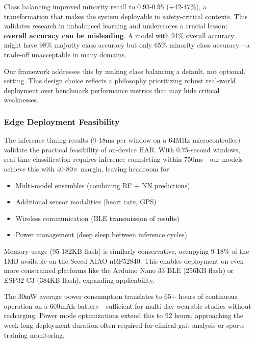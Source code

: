 Class balancing improved minority recall to 0.93-0.95 (+42-47\%), a transformation that makes the system deployable in safety-critical contexts. This validates research in imbalanced learning \cite{he2009learning, chawla2002smote} and underscores a crucial lesson: \textbf{overall accuracy can be misleading}. A model with 91\% overall accuracy might have 98\% majority class accuracy but only 65\% minority class accuracy—a trade-off unacceptable in many domains.

Our framework addresses this by making class balancing a default, not optional, setting. This design choice reflects a philosophy prioritizing robust real-world deployment over benchmark performance metrics that may hide critical weaknesses.

\subsubsection{Edge Deployment Feasibility}
The inference timing results (9-18ms per window on a 64MHz microcontroller) validate the practical feasibility of on-device HAR. With 0.75-second windows, real-time classification requires inference completing within 750ms—our models achieve this with 40-80× margin, leaving headroom for:
\begin{itemize}
    \item Multi-model ensembles (combining RF + NN predictions)
    \item Additional sensor modalities (heart rate, GPS)
    \item Wireless communication (BLE transmission of results)
    \item Power management (deep sleep between inference cycles)
\end{itemize}

Memory usage (95-182KB flash) is similarly conservative, occupying 9-18\% of the 1MB available on the Seeed XIAO nRF52840. This enables deployment on even more constrained platforms like the Arduino Nano 33 BLE (256KB flash) or ESP32-C3 (384KB flash), expanding applicability.

The 30mW average power consumption translates to 65+ hours of continuous operation on a 600mAh battery—sufficient for multi-day wearable studies without recharging. Power mode optimizations extend this to 92 hours, approaching the week-long deployment duration often required for clinical gait analysis or sports training monitoring.

